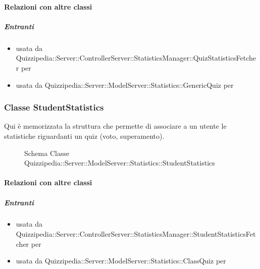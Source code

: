 \paragraph{Relazioni con altre classi}
\subparagraph{Entranti}
\begin{itemize}
\item usata da Quizzipedia::Server::ControllerServer::StatisticsManager::QuizStatisticsFetcher per 
\item usata da Quizzipedia::Server::ModelServer::Statistics::GenericQuiz per 
\end{itemize}
\subsubsection{Classe StudentStatistics}
Qui è memorizzata la struttura che permette di associare a un utente le statistiche riguardanti un quiz (voto, superamento).
\begin{figure}[H]
\centering
\noindent{}
\caption[Schema Classe StudentStatistics]{Schema Classe Quizzipedia::Server::ModelServer::Statistics::StudentStatistics}
\end{figure}
\paragraph{Relazioni con altre classi}
\subparagraph{Entranti}
\begin{itemize}
\item usata da Quizzipedia::Server::ControllerServer::StatisticsManager::StudentStatisticsFetcher per 
\item usata da Quizzipedia::Server::ModelServer::Statistics::ClassQuiz per 
\end{itemize}
